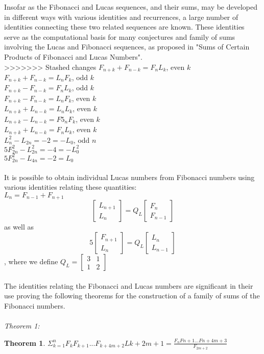 \documentclass[11pt]{article}
\newtheorem{theorem}{Theorem}
\begin{document}
Insofar as the Fibonacci and Lucas sequences, and their sums, may be developed in different ways with various identities and recurrences, a large number of identities connecting these two related sequences are known. These identities serve as the computational basis for many conjectures and family of sums involving the Lucas and Fibonacci sequences, as proposed in "Sums of Certain Products of Fibonacci and Lucas Numbers". \\
>>>>>>> Stashed changes
$F_{n+k} + F_{n-k} = F_{n}L_{k}$, even $k$\\
$F_{n+k} + F_{n-k} = L_{n}F_{k}$, odd $k$\\$F_{n+k} - F_{n-k} = F_{n}L_{k}$, odd $k$ \\ $F_{n+k} - F_{n-k} = L_{n}F_{k}$, even $k$ \\ $L_{n+k} + L_{n-k} = L_{n}L_{k}$, even $k$ \\ $L_{n+k} - L_{n-k}= F5_{n}F_{k}$, even $k$ \\ $L_{n+k} + L_{n-k} = F_{n}L_{k}$, even $k$\\ $L_{n}^{2} - L_{2n} = -2 = -L_{0}$, odd $n$\\ $5F_{2n}^{2} - L_{2n}^{2} = -4 = -L_{0}^{2}$\\ $5F_{2n}^{2} - L_{4n} = -2 = L_{0}$\\\\  It is possible to obtain individual Lucas numbers from Fibonacci numbers using various identities relating these quantities:\\$L_{n} = F_{n-1} + F_{n+1}$ \\ 
\[
\begin{bmatrix}
L_{n+1} \\
L_{n}
\end{bmatrix} = Q_{L} \begin{bmatrix} F_{n} \\ F_{n-1}\end{bmatrix}
\] 
as well as \\
\[
5\begin{bmatrix}
F_{n+1} \\
L_{n}
\end{bmatrix} = Q_{L} \begin{bmatrix} L_{n} \\ L_{n-1}\end{bmatrix}
\] , where we define $Q_{L} = \begin{bmatrix} 3 & 1 \\ 1 & 2 \end{bmatrix}$
\\
\\
The identities relating the Fibonacci and Lucas numbers are significant in their use proving the following theorems for the construction of a family of sums of the Fibonacci numbers.\\ \\
\textit{Theorem 1:}  
\begin{theorem}
$\Sigma_{k=1}^{n} F_{k}F_{k+1}...F_{k+4m+2}L{k+2m+1} = \frac{F_{n}F{n+1}...F{n+4m+3}}{F_{2m+2}}$
\end{theorem} 
\end{document}
